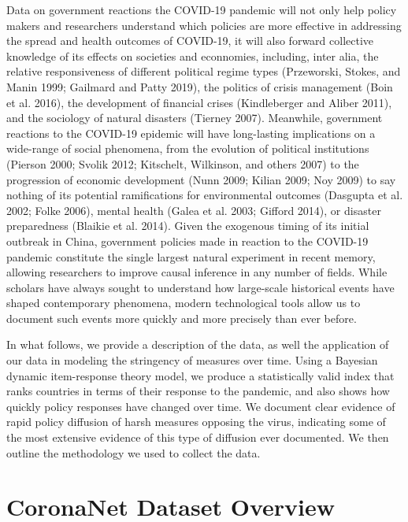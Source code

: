 \documentclass[]{article}
\begin{document}
Data on government reactions the COVID-19 pandemic will not only help policy makers and researchers understand which policies are more effective in addressing the spread and health outcomes of COVID-19, it will also forward collective knowledge of its effects on societies and econnomies, including, inter alia, the relative responsiveness of different political regime types (Przeworski, Stokes, and Manin 1999; Gailmard and Patty 2019), the politics of crisis management (Boin et al. 2016), the development of financial crises (Kindleberger and Aliber 2011), and the sociology of natural disasters (Tierney 2007). Meanwhile, government reactions to the COVID-19 epidemic will have long-lasting implications on a wide-range of social phenomena, from the evolution of political institutions (Pierson 2000; Svolik 2012; Kitschelt, Wilkinson, and others 2007) to the progression of economic development (Nunn 2009; Kilian 2009; Noy 2009) to say nothing of its potential ramifications for environmental outcomes (Dasgupta et al. 2002; Folke 2006), mental health (Galea et al. 2003; Gifford 2014), or disaster preparedness (Blaikie et al. 2014). Given the exogenous timing of its initial outbreak in China, government policies made in reaction to the COVID-19 pandemic constitute the single largest natural experiment in recent memory, allowing researchers to improve causal inference in any number of fields. While scholars have always sought to understand how large-scale historical events have shaped contemporary phenomena, modern technological tools allow us to document such events more quickly and more precisely than ever before.

In what follows, we provide a description of the data, as well the application of our data in modeling the stringency of measures over time. Using a Bayesian dynamic item-response theory model, we produce a statistically valid index that ranks countries in terms of their response to the pandemic, and also shows how quickly policy responses have changed over time. We document clear evidence of rapid policy diffusion of harsh measures opposing the virus, indicating some of the most extensive evidence of this type of diffusion ever documented. We then outline the methodology we used to collect the data.

\hypertarget{coronanet-dataset-overview}{%
\section{CoronaNet Dataset Overview}\label{coronanet-dataset-overview}}
\end{document}
